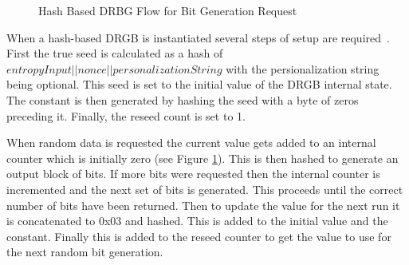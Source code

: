 \documentclass[sigconf]{acmart}
\begin{document}
\begin{figure}[ht]
\caption{Hash Based DRBG Flow for Bit Generation Request~\cite{barker2015nist90a}}
\label{fig:DRBG}
\end{figure}

When a hash-based DRGB is instantiated several steps of setup are required~\cite{barker2015nist90a}. First the true seed is calculated as a hash of \\$entropyInput || nonce || personalizationString$ with the persionalization string being optional. This seed is set to the initial value of the DRGB internal state. The constant is then generated by hashing the seed with a byte of zeros preceding it. Finally, the reseed count is set to 1. 

When random data is requested the current value gets added to an internal counter which is initially zero (see Figure \ref{fig:DRBG}). This is then hashed to generate an output block of bits. If more bits were requested then the internal counter is incremented and the next set of bits is generated. This proceeds until the correct number of bits have been returned. Then to update the value for the next run it is concatenated to 0x03 and hashed. This is added to the initial value and the constant. Finally this is added to the reseed counter to get the value to use for the next random bit generation. 
\end{document}
